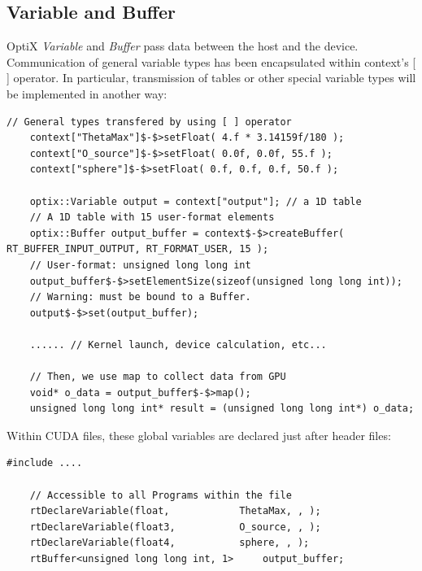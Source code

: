 \subsection{Variable and Buffer}
OptiX \textit{Variable} and \textit{Buffer} pass data between the host and the device. Communication of general variable types has been encapsulated within context's [ ] operator. In particular, transmission of tables or other special variable types will be implemented in another way:
\begin{lstlisting}[mathescape]
    // General types transfered by using [ ] operator
    context["ThetaMax"]$-$>setFloat( 4.f * 3.14159f/180 );
    context["O_source"]$-$>setFloat( 0.0f, 0.0f, 55.f );
    context["sphere"]$-$>setFloat( 0.f, 0.f, 0.f, 50.f );
    
    optix::Variable output = context["output"]; // a 1D table
    // A 1D table with 15 user-format elements
    optix::Buffer output_buffer = context$-$>createBuffer( RT_BUFFER_INPUT_OUTPUT, RT_FORMAT_USER, 15 );
    // User-format: unsigned long long int
    output_buffer$-$>setElementSize(sizeof(unsigned long long int)); 
    // Warning: must be bound to a Buffer. 
    output$-$>set(output_buffer);

    ...... // Kernel launch, device calculation, etc...
        
    // Then, we use map to collect data from GPU
    void* o_data = output_buffer$-$>map();
    unsigned long long int* result = (unsigned long long int*) o_data;
\end{lstlisting}
Within CUDA files, these global variables are declared just after header files:
\begin{lstlisting}[mathescape]
    #include ....
    
    // Accessible to all Programs within the file
    rtDeclareVariable(float,			ThetaMax, , );
    rtDeclareVariable(float3,			O_source, , );
    rtDeclareVariable(float4,			sphere, , );
    rtBuffer<unsigned long long int, 1>		output_buffer;
\end{lstlisting}

